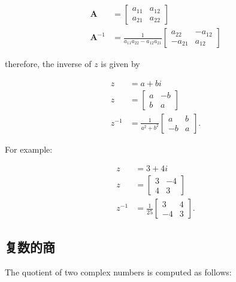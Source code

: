 $$
\begin{aligned}
\mathbf{A} & =\left[\begin{array}{ll}
a_{11} & a_{12} \\
a_{21} & a_{22}
\end{array}\right] \\
\mathbf{A}^{-1} & =\frac{1}{a_{11} a_{22}-a_{12} a_{21}}\left[\begin{array}{cc}
a_{22} & -a_{12} \\
-a_{21} & a_{12}
\end{array}\right]
\end{aligned}
$$

therefore, the inverse of $z$ is given by

$$
\begin{aligned}
z & =a+b i \\
z & =\left[\begin{array}{cc}
a & -b \\
b & a
\end{array}\right] \\
z^{-1} & =\frac{1}{a^{2}+b^{2}}\left[\begin{array}{cc}
a & b \\
-b & a
\end{array}\right] .
\end{aligned}
$$

For example:

$$
\begin{aligned}
z & =3+4 i \\
z & =\left[\begin{array}{cc}
3 & -4 \\
4 & 3
\end{array}\right] \\
z^{-1} & =\frac{1}{25}\left[\begin{array}{cc}
3 & 4 \\
-4 & 3
\end{array}\right] .
\end{aligned}
$$

\subsection{复数的商}
The quotient of two complex numbers is computed as follows:

